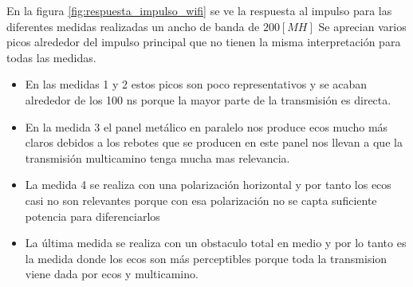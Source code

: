 \documentclass[10pt,conference,a4paper]{IEEEtran}
\begin{document}
En la figura \ref{fig:respuesta_impulso_wifi} se ve la respuesta al impulso para las diferentes medidas realizadas  un ancho de banda de $200[MH]$
Se aprecian varios picos alrededor del impulso principal que no tienen la misma interpretación para todas las medidas.
\begin{itemize}
    \item En las medidas 1 y 2 estos picos son poco representativos y se acaban alrededor de los 100 ns porque la mayor parte de la transmisión es directa.
    \item En la medida 3 el panel metálico en paralelo nos produce ecos mucho más claros debidos a los rebotes que se producen en este panel nos llevan a que la transmisión multicamino tenga mucha mas relevancia.
    \item La medida 4 se realiza con una polarización horizontal y por tanto los ecos casi no son relevantes porque con esa polarización no se capta suficiente potencia para diferenciarlos
    \item La última medida se realiza con un obstaculo total en medio y por lo tanto es la medida donde los ecos son más perceptibles porque toda la transmision viene dada por ecos y multicamino.
\end{itemize}
\end{document}
